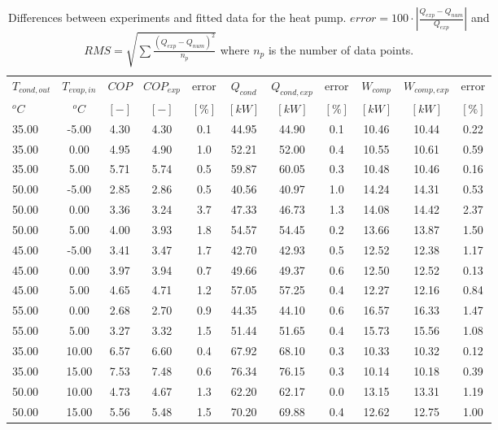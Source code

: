 \documentclass[english]{SPFShortReport}
\begin{document}
\begin{table}[!ht]
\begin{small}
\caption{Differences between experiments and fitted data for the heat pump.          $error=100 \cdot |\frac{Q_{exp}-Q_{num}}{Q_{exp}}|$ and $RMS = \sqrt { \sum{\frac{(Q_{exp}-Q_{num})^2}{n_p}} }$ where $n_p$ is the number of data points.}
\begin{center}
\resizebox{12cm}{!} 
{
\begin{tabular}{l | c c c c c c c c c c } 
\hline
\hline
$T_{cond,out}$ &$T_{evap,in}$ &$COP$ &$COP_{exp}$ &error &$Q_{cond}$ &$Q_{cond,exp}$ &error &$W_{comp}$ &$W_{comp,exp}$ &error \\ 
$^oC$ &$^oC$ &$[-]$ &$[-]$ &$[\%]$ &$[kW]$ &$[kW]$ &$[\%]$ &$[kW]$ &$[kW]$ &$[\%]$\\ 
\hline
35.00  & -5.00 & 4.30 & 4.30 & 0.1 & 44.95 & 44.90 & 0.1 & 10.46 & 10.44 & 0.22\\ 
35.00  & 0.00 & 4.95 & 4.90 & 1.0 & 52.21 & 52.00 & 0.4 & 10.55 & 10.61 & 0.59\\ 
35.00  & 5.00 & 5.71 & 5.74 & 0.5 & 59.87 & 60.05 & 0.3 & 10.48 & 10.46 & 0.16\\ 
50.00  & -5.00 & 2.85 & 2.86 & 0.5 & 40.56 & 40.97 & 1.0 & 14.24 & 14.31 & 0.53\\ 
50.00  & 0.00 & 3.36 & 3.24 & 3.7 & 47.33 & 46.73 & 1.3 & 14.08 & 14.42 & 2.37\\ 
50.00  & 5.00 & 4.00 & 3.93 & 1.8 & 54.57 & 54.45 & 0.2 & 13.66 & 13.87 & 1.50\\ 
45.00  & -5.00 & 3.41 & 3.47 & 1.7 & 42.70 & 42.93 & 0.5 & 12.52 & 12.38 & 1.17\\ 
45.00  & 0.00 & 3.97 & 3.94 & 0.7 & 49.66 & 49.37 & 0.6 & 12.50 & 12.52 & 0.13\\ 
45.00  & 5.00 & 4.65 & 4.71 & 1.2 & 57.05 & 57.25 & 0.4 & 12.27 & 12.16 & 0.84\\ 
55.00  & 0.00 & 2.68 & 2.70 & 0.9 & 44.35 & 44.10 & 0.6 & 16.57 & 16.33 & 1.47\\ 
55.00  & 5.00 & 3.27 & 3.32 & 1.5 & 51.44 & 51.65 & 0.4 & 15.73 & 15.56 & 1.08\\ 
35.00  & 10.00 & 6.57 & 6.60 & 0.4 & 67.92 & 68.10 & 0.3 & 10.33 & 10.32 & 0.12\\ 
35.00  & 15.00 & 7.53 & 7.48 & 0.6 & 76.34 & 76.15 & 0.3 & 10.14 & 10.18 & 0.39\\ 
50.00  & 10.00 & 4.73 & 4.67 & 1.3 & 62.20 & 62.17 & 0.0 & 13.15 & 13.31 & 1.19\\ 
50.00  & 15.00 & 5.56 & 5.48 & 1.5 & 70.20 & 69.88 & 0.4 & 12.62 & 12.75 & 1.00\\ 

\end{tabular}}
\end{center}
\end{small}
\end{table}
\end{document}
